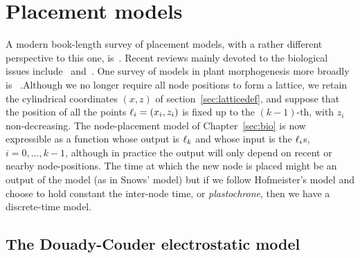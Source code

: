 
 
\chapter{Placement models}
\label{ch:placement}

 A modern book-length survey of placement models, with a rather different perspective to this one, is~\autocite{barabePhyllotacticPatternsMultidisciplinary2020}. Recent reviews mainly devoted to the biological issues include~\cite{traasPhyllotaxis2013} and~\cite{godinPhyllotaxisGeometricCanalization2020}. One survey of models in plant morphogenesis more broadly is  ~\autocite{prusinkiewiczComputationalModelsPlant2012}.Although we no longer require all node positions to form a lattice, we retain the cylindrical coordinates $(x,z)$ of section~\ref{sec:latticedef}, and suppose that the position of all the points $\ell_{{i}} = (x_i,z_i)$ is fixed up to the $(k-1)$-th, with $z_i$ non-decreasing. The node-placement model of Chapter~\ref{sec:bio} is now expressible as a function whose output is $\ell_{{k}}$ and whose input is the $\ell_{{i}}$s, $i=0,\ldots, k-1$,
although in practice the output will only depend on recent or nearby node-positions. The time at which the new node is placed might be an output of the model (as in Snows' model) but if we follow Hofmeister's model and choose to hold constant the inter-node time, or \textit{plastochrone},  then we have a discrete-time model. 


\section{The Douady-Couder electrostatic model}
\label{sec:DouadyCouderModel}

